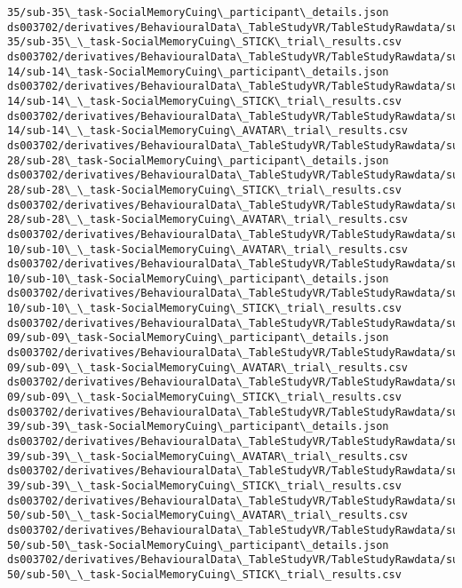 \documentclass[11pt]{article}
\begin{document}
\begin{Verbatim}[commandchars=\\\{\}]
35/sub-35\_task-SocialMemoryCuing\_participant\_details.json
ds003702/derivatives/BehaviouralData\_TableStudyVR/TableStudyRawdata/sub-
35/sub-35\_\_task-SocialMemoryCuing\_STICK\_trial\_results.csv
ds003702/derivatives/BehaviouralData\_TableStudyVR/TableStudyRawdata/sub-
14/sub-14\_task-SocialMemoryCuing\_participant\_details.json
ds003702/derivatives/BehaviouralData\_TableStudyVR/TableStudyRawdata/sub-
14/sub-14\_\_task-SocialMemoryCuing\_STICK\_trial\_results.csv
ds003702/derivatives/BehaviouralData\_TableStudyVR/TableStudyRawdata/sub-
14/sub-14\_\_task-SocialMemoryCuing\_AVATAR\_trial\_results.csv
ds003702/derivatives/BehaviouralData\_TableStudyVR/TableStudyRawdata/sub-
28/sub-28\_task-SocialMemoryCuing\_participant\_details.json
ds003702/derivatives/BehaviouralData\_TableStudyVR/TableStudyRawdata/sub-
28/sub-28\_\_task-SocialMemoryCuing\_STICK\_trial\_results.csv
ds003702/derivatives/BehaviouralData\_TableStudyVR/TableStudyRawdata/sub-
28/sub-28\_\_task-SocialMemoryCuing\_AVATAR\_trial\_results.csv
ds003702/derivatives/BehaviouralData\_TableStudyVR/TableStudyRawdata/sub-
10/sub-10\_\_task-SocialMemoryCuing\_AVATAR\_trial\_results.csv
ds003702/derivatives/BehaviouralData\_TableStudyVR/TableStudyRawdata/sub-
10/sub-10\_task-SocialMemoryCuing\_participant\_details.json
ds003702/derivatives/BehaviouralData\_TableStudyVR/TableStudyRawdata/sub-
10/sub-10\_\_task-SocialMemoryCuing\_STICK\_trial\_results.csv
ds003702/derivatives/BehaviouralData\_TableStudyVR/TableStudyRawdata/sub-
09/sub-09\_task-SocialMemoryCuing\_participant\_details.json
ds003702/derivatives/BehaviouralData\_TableStudyVR/TableStudyRawdata/sub-
09/sub-09\_\_task-SocialMemoryCuing\_AVATAR\_trial\_results.csv
ds003702/derivatives/BehaviouralData\_TableStudyVR/TableStudyRawdata/sub-
09/sub-09\_\_task-SocialMemoryCuing\_STICK\_trial\_results.csv
ds003702/derivatives/BehaviouralData\_TableStudyVR/TableStudyRawdata/sub-
39/sub-39\_task-SocialMemoryCuing\_participant\_details.json
ds003702/derivatives/BehaviouralData\_TableStudyVR/TableStudyRawdata/sub-
39/sub-39\_\_task-SocialMemoryCuing\_AVATAR\_trial\_results.csv
ds003702/derivatives/BehaviouralData\_TableStudyVR/TableStudyRawdata/sub-
39/sub-39\_\_task-SocialMemoryCuing\_STICK\_trial\_results.csv
ds003702/derivatives/BehaviouralData\_TableStudyVR/TableStudyRawdata/sub-
50/sub-50\_\_task-SocialMemoryCuing\_AVATAR\_trial\_results.csv
ds003702/derivatives/BehaviouralData\_TableStudyVR/TableStudyRawdata/sub-
50/sub-50\_task-SocialMemoryCuing\_participant\_details.json
ds003702/derivatives/BehaviouralData\_TableStudyVR/TableStudyRawdata/sub-
50/sub-50\_\_task-SocialMemoryCuing\_STICK\_trial\_results.csv

\end{Verbatim}
\end{document}
